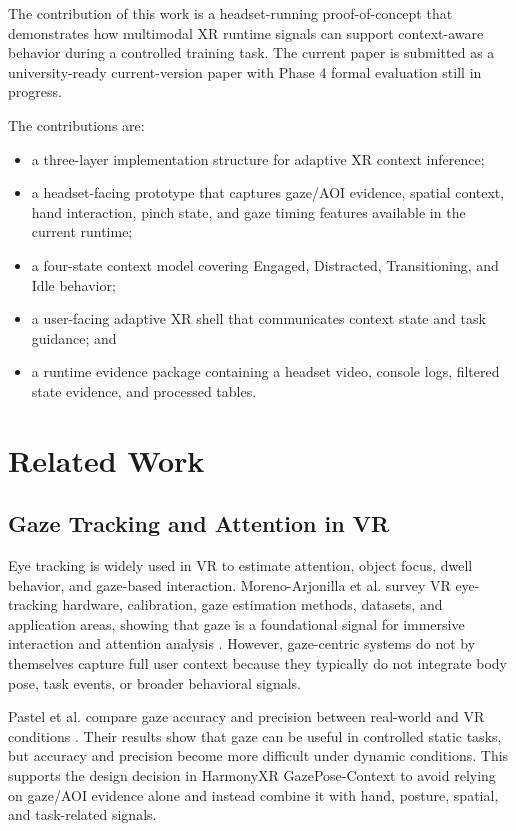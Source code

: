 \documentclass[conference]{IEEEtran}
\begin{document}
The contribution of this work is a headset-running proof-of-concept that demonstrates how multimodal XR runtime signals can support context-aware behavior during a controlled training task. The current paper is submitted as a university-ready current-version paper with Phase 4 formal evaluation still in progress.

The contributions are:
\begin{itemize}
\item a three-layer implementation structure for adaptive XR context inference;
\item a headset-facing prototype that captures gaze/AOI evidence, spatial context, hand interaction, pinch state, and gaze timing features available in the current runtime;
\item a four-state context model covering Engaged, Distracted, Transitioning, and Idle behavior;
\item a user-facing adaptive XR shell that communicates context state and task guidance; and
\item a runtime evidence package containing a headset video, console logs, filtered state evidence, and processed tables.
\end{itemize}

\section{Related Work}
\subsection{Gaze Tracking and Attention in VR}
Eye tracking is widely used in VR to estimate attention, object focus, dwell behavior, and gaze-based interaction. Moreno-Arjonilla et al. survey VR eye-tracking hardware, calibration, gaze estimation methods, datasets, and application areas, showing that gaze is a foundational signal for immersive interaction and attention analysis \cite{moreno2024eyetracking}. However, gaze-centric systems do not by themselves capture full user context because they typically do not integrate body pose, task events, or broader behavioral signals.

Pastel et al. compare gaze accuracy and precision between real-world and VR conditions \cite{pastel2021gaze}. Their results show that gaze can be useful in controlled static tasks, but accuracy and precision become more difficult under dynamic conditions. This supports the design decision in HarmonyXR GazePose-Context to avoid relying on gaze/AOI evidence alone and instead combine it with hand, posture, spatial, and task-related signals.
\end{document}

